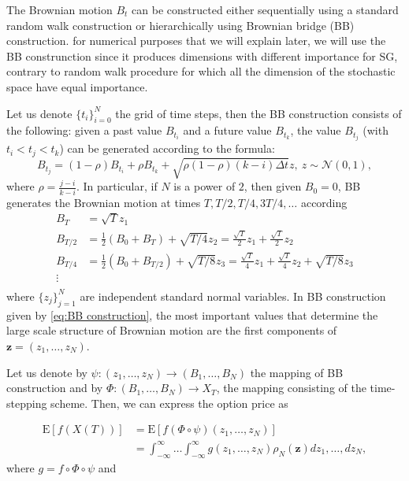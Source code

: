 \documentclass[11pt]{article}
\newcommand{\expt}[1]{\mathrm{E}\left[#1\right]}
\newcommand{\COMMA}{,}
\begin{document}
The Brownian motion $B_t$ can be constructed either sequentially using a standard random walk construction or hierarchically using Brownian bridge (BB) construction. for numerical purposes that we will explain later, we will use the BB construnction since it produces  dimensions with different importance for SG, contrary to random walk procedure for which all the dimension of the stochastic space have equal importance. 



Let us denote $\{t_i\}_{i=0}^{N}$ the grid of time steps, then the BB construction \cite{glasserman2004monte} consists of the following: given a past value $B_{t_i}$ and a future value $B_{t_k}$, the value $B_{t_j}$ (with $t_i < t_j < t_k$) can be generated according to the formula:
\begin{equation}
B_{t_j}=(1-\rho) B_{t_i}+\rho B_{t_k}+ \sqrt{\rho (1-\rho)(k-i) \Delta t} z, \: z \sim \mathcal{N}(0,1) \COMMA
\end{equation}
where $\rho=\frac{j-i}{k-i}$.  In particular, if $N$ is a power of $2$, then given $B_0=0$, BB generates the Brownian motion at times $T, T/2,T/4,3T/4,\dots$ according
\begin{align}\label{eq:BB construction}
	B_T&=\sqrt{T}z_1\nonumber\\
	B_{T/2}&= \frac{1}{2}(B_{0}+B_{T})+\sqrt{T/4}z_2= \frac{\sqrt{T}}{2} z_1+\frac{\sqrt{T}}{2} z_2\nonumber\\
	B_{T/4}&=\frac{1}{2} (B_{0}+B_{T/2})+\sqrt{T/8}z_3= \frac{\sqrt{T}}{4} z_1+\frac{\sqrt{T}}{4} z_2+\sqrt{T/8}z_3\nonumber\\
	\vdots \nonumber\\
\end{align}
where $\{z_j\}_{j=1}^{N}$ are independent standard normal variables.  In BB construction given by \eqref{eq:BB construction}, the most important values that determine the large scale structure of Brownian motion are the first components of $\mathbf{z} = (z_1,\dots,z_N)$.

Let us denote by $\psi: (z_1,\dots,z_N) \rightarrow (B_1,\dots,B_N)$ the mapping of BB construction and by $\Phi: (B_1,\dots,B_N) \rightarrow X_T$, the mapping consisting of the time-stepping scheme. Then, we can express the option price as

\begin{align}\label{eq: option price as integral}
\expt{f(X(T))}&=		\expt{f\left(\Phi \circ \psi \right) (z_1,\dots,z_N)} \nonumber\\
&=\int_{-\infty}^{\infty} \dots \int_{-\infty}^{\infty} g(z_1,\dots,z_N) \rho_N(\mathbf{z}) dz_1,\dots,dz_N \COMMA
\end{align}
where $g=f \circ \Phi \circ \psi$ and
\end{document}
